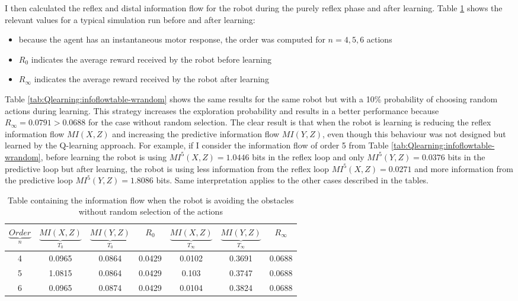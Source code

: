 I then calculated the reflex and distal information flow for the robot during the purely reflex phase and after learning.
Table \ref{tab:Qlearning:infoflowtable-worandom} shows the relevant values
for a typical simulation run before and after learning:
\begin{itemize}
 \item because the agent has an instantaneous motor response, the order was computed
for $n=4,5,6$ actions
\item $R_0$ indicates the average reward received by the robot before learning
\item $R_\infty$ indicates the average reward received by the robot after learning
\end{itemize}
Table \ref{tab:Qlearning:infoflowtable-wrandom} shows the same results for the
same robot but with a 10\% probability of choosing random actions during learning.
This strategy increases the exploration probability and results in a better
performance because $R_\infty=0.0791>0.0688$ for the case without random selection.
The clear result is that when the robot is learning is reducing the reflex information
flow $MI(X,Z)$ and increasing the predictive information flow $MI(Y,Z)$,
even though this behaviour was not designed but learned by the Q-learning approach.
For example, if I consider the information flow of order 5 from Table \ref{tab:Qlearning:infoflowtable-wrandom},
before learning the robot is using $MI^{5}(X,Z)=1.0446$ bits in the reflex loop
and only $MI^{5}(Y,Z)=0.0376 $ bits in the predictive loop but after learning,
the robot is using less information from the reflex loop $MI^{5}(X,Z)=0.0271$ and
more information from the predictive loop $MI^{5}(Y,Z)=1.8086 $ bits.
Same interpretation applies to the other cases described in the tables.

\begin{table}[htbp]
\addtolength{\tabcolsep}{-2pt}
\centering
\begin{tabular}{| c|| c| c | c| c | c | c |}
\hline
$\underbrace{Order}_ n$& $\underbrace{MI(X,Z)}_{T_0}$& $\underbrace{MI(Y,Z)}_{T_0}$ & $R_0$ & $\underbrace{MI(X,Z)}_{T_\infty}$& $\underbrace{MI(Y,Z)}_{T_\infty}$ & $R_\infty$ \\
\hline
4 & 0.0965 & 0.0864 & 0.0429 & 0.0102 & 0.3691 & 0.0688 \\
\hline
5 & 1.0815 & 0.0864 & 0.0429 & 0.103 & 0.3747 & 0.0688 \\
\hline
6 & 0.0965 & 0.0874 & 0.0429 & 0.0104 & 0.3824 & 0.0688 \\
\hline
\end{tabular}
\caption[Information flow for avoidance robot]{Table containing the information flow when
the robot is avoiding the obstacles without random selection of the actions}
\label{tab:Qlearning:infoflowtable-worandom}
\end{table}

